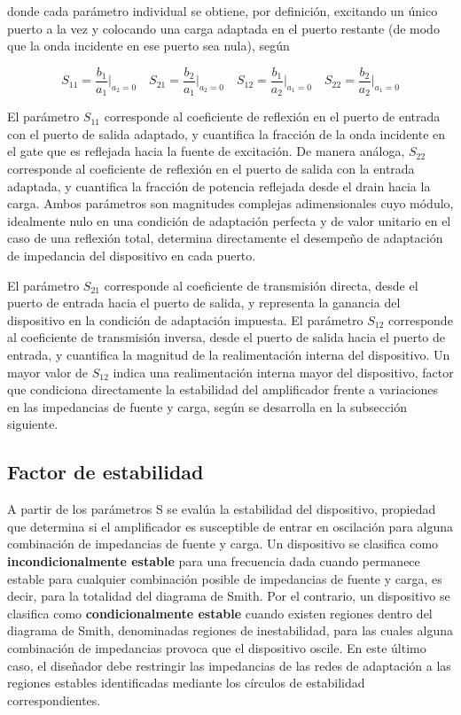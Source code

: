 donde cada parámetro individual se obtiene, por definición, excitando un único puerto a la vez y colocando una carga adaptada en el puerto restante (de modo que la onda incidente en ese puerto sea nula), según

\begin{equation}
    S_{11} = \frac{b_1}{a_1}\bigg|_{a_2 = 0} \quad
    S_{21} = \frac{b_2}{a_1}\bigg|_{a_2 = 0} \quad
    S_{12} = \frac{b_1}{a_2}\bigg|_{a_1 = 0} \quad
    S_{22} = \frac{b_2}{a_2}\bigg|_{a_1 = 0}
    \label{eq:definicion_s}
\end{equation}

El parámetro $S_{11}$ corresponde al coeficiente de reflexión en el puerto de entrada con el puerto de salida adaptado, y cuantifica la fracción de la onda incidente en el gate que es reflejada hacia la fuente de excitación. De manera análoga, $S_{22}$ corresponde al coeficiente de reflexión en el puerto de salida con la entrada adaptada, y cuantifica la fracción de potencia reflejada desde el drain hacia la carga. Ambos parámetros son magnitudes complejas adimensionales cuyo módulo, idealmente nulo en una condición de adaptación perfecta y de valor unitario en el caso de una reflexión total, determina directamente el desempeño de adaptación de impedancia del dispositivo en cada puerto.

El parámetro $S_{21}$ corresponde al coeficiente de transmisión directa, desde el puerto de entrada hacia el puerto de salida, y representa la ganancia del dispositivo en la condición de adaptación impuesta. El parámetro $S_{12}$ corresponde al coeficiente de transmisión inversa, desde el puerto de salida hacia el puerto de entrada, y cuantifica la magnitud de la realimentación interna del dispositivo. Un mayor valor de $S_{12}$ indica una realimentación interna mayor del dispositivo, factor que condiciona directamente la estabilidad del amplificador frente a variaciones en las impedancias de fuente y carga, según se desarrolla en la subsección siguiente.

\subsection{Factor de estabilidad}
A partir de los parámetros S se evalúa la estabilidad del dispositivo, propiedad que determina si el amplificador es susceptible de entrar en oscilación para alguna combinación de impedancias de fuente y carga. Un dispositivo se clasifica como \textbf{incondicionalmente estable} para una frecuencia dada cuando permanece estable para cualquier combinación posible de impedancias de fuente y carga, es decir, para la totalidad del diagrama de Smith. Por el contrario, un dispositivo se clasifica como \textbf{condicionalmente estable} cuando existen regiones dentro del diagrama de Smith, denominadas regiones de inestabilidad, para las cuales alguna combinación de impedancias provoca que el dispositivo oscile. En este último caso, el diseñador debe restringir las impedancias de las redes de adaptación a las regiones estables identificadas mediante los círculos de estabilidad correspondientes.

